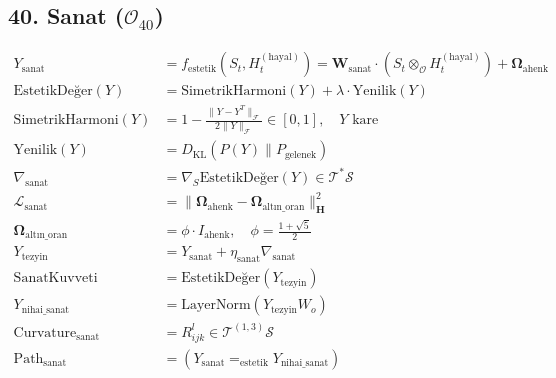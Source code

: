 \documentclass[11pt, a4paper]{article}
\begin{document}
\subsection{40. Sanat ($\mathcal{O}_{40}$)}
\begin{align}
Y_{\text{sanat}} &= f_{\text{estetik}}(S_t, H_t^{(\text{hayal})}) = \mathbf{W}_{\text{sanat}} \cdot \left( S_t \otimes_{\mathcal{O}} H_t^{(\text{hayal})} \right) + \mathbf{\Omega}_{\text{ahenk}} \\
\text{EstetikDeğer}(Y) &= \text{SimetrikHarmoni}(Y) + \lambda \cdot \text{Yenilik}(Y) \\
\text{SimetrikHarmoni}(Y) &= 1 - \frac{\| Y - Y^T \|_{\mathcal{F}}}{2\|Y\|_{\mathcal{F}}} \in [0,1], \quad Y \text{ kare} \\
\text{Yenilik}(Y) &= D_{\text{KL}}(P(Y) \parallel P_{\text{gelenek}}) \\
\nabla_{\text{sanat}} &= \nabla_S \text{EstetikDeğer}(Y) \in \mathcal{T}^*\mathcal{S} \\
\mathcal{L}_{\text{sanat}} &= \|\mathbf{\Omega}_{\text{ahenk}} - \mathbf{\Omega}_{\text{altın\_oran}}\|_{\mathbf{H}}^2 \\
\mathbf{\Omega}_{\text{altın\_oran}} &= \phi \cdot I_{\text{ahenk}}, \quad \phi = \frac{1+\sqrt{5}}{2} \\
Y_{\text{tezyin}} &= Y_{\text{sanat}} + \eta_{\text{sanat}} \nabla_{\text{sanat}} \\
\text{SanatKuvveti} &= \text{EstetikDeğer}(Y_{\text{tezyin}}) \\
Y_{\text{nihai\_sanat}} &= \text{LayerNorm}(Y_{\text{tezyin}} W_o) \\
\text{Curvature}_{\text{sanat}} &= R_{ijk}^l \in \mathcal{T}^{(1,3)}\mathcal{S} \\
\text{Path}_{\text{sanat}} &= (Y_{\text{sanat}} =_{\text{estetik}} Y_{\text{nihai\_sanat}})
\end{align}
\end{document}
